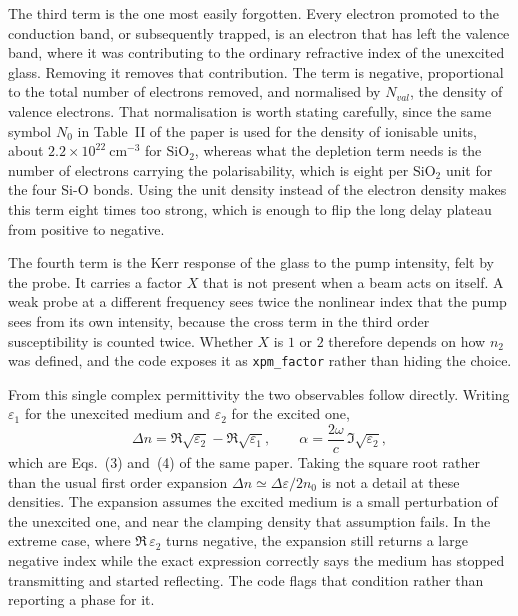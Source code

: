 The third term is the one most easily forgotten. Every electron promoted to the conduction band, or subsequently trapped, is an electron that has left the valence band, where it was contributing to the ordinary refractive index of the unexcited glass. Removing it removes that contribution. The term is negative, proportional to the total number of electrons removed, and normalised by $N_{val}$, the density of valence electrons. That normalisation is worth stating carefully, since the same symbol $N_0$ in Table~II of the paper is used for the density of ionisable units, about $2.2\times10^{22}\ \text{cm}^{-3}$ for $\mathrm{SiO}_2$, whereas what the depletion term needs is the number of electrons carrying the polarisability, which is eight per $\mathrm{SiO}_2$ unit for the four Si-O bonds. Using the unit density instead of the electron density makes this term eight times too strong, which is enough to flip the long delay plateau from positive to negative.

The fourth term is the Kerr response of the glass to the pump intensity, felt by the probe. It carries a factor $X$ that is not present when a beam acts on itself. A weak probe at a different frequency sees twice the nonlinear index that the pump sees from its own intensity, because the cross term in the third order susceptibility is counted twice. Whether $X$ is $1$ or $2$ therefore depends on how $n_2$ was defined, and the code exposes it as \texttt{xpm\_factor} rather than hiding the choice.

From this single complex permittivity the two observables follow directly. Writing $\varepsilon_1$ for the unexcited medium and $\varepsilon_2$ for the excited one,
\begin{equation}
\label{eq:martin_obs}
\Delta n = \Re\sqrt{\varepsilon_2}-\Re\sqrt{\varepsilon_1},
\qquad
\alpha = \frac{2\omega}{c}\,\Im\sqrt{\varepsilon_2},
\end{equation}
which are Eqs.~(3) and~(4) of the same paper. Taking the square root rather than the usual first order expansion $\Delta n\simeq\Delta\varepsilon/2n_0$ is not a detail at these densities. The expansion assumes the excited medium is a small perturbation of the unexcited one, and near the clamping density that assumption fails. In the extreme case, where $\Re\,\varepsilon_2$ turns negative, the expansion still returns a large negative index while the exact expression correctly says the medium has stopped transmitting and started reflecting. The code flags that condition rather than reporting a phase for it.

